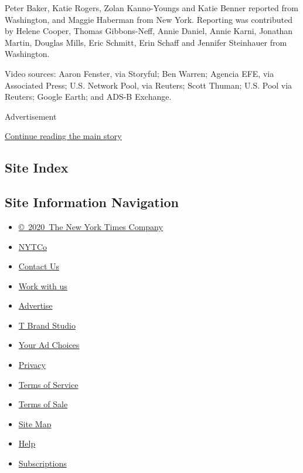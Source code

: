 Peter Baker, Katie Rogers, Zolan Kanno-Youngs and Katie Benner reported
from Washington, and Maggie Haberman from New York. Reporting was
contributed by Helene Cooper, Thomas Gibbons-Neff, Annie Daniel, Annie
Karni, Jonathan Martin, Douglas Mills, Eric Schmitt, Erin Schaff and
Jennifer Steinhauer from Washington.

Video sources: Aaron Fenster, via Storyful; Ben Warren; Agencia EFE, via
Associated Press; U.S. Network Pool, via Reuters; Scott Thuman; U.S.
Pool via Reuters; Google Earth; and ADS-B Exchange.

Advertisement

\protect\hyperlink{after-bottom}{Continue reading the main story}

\hypertarget{site-index}{%
\subsection{Site Index}\label{site-index}}

\hypertarget{site-information-navigation}{%
\subsection{Site Information
Navigation}\label{site-information-navigation}}

\begin{itemize}
\tightlist
\item
  \href{https://help.nytimes3xbfgragh.onion/hc/en-us/articles/115014792127-Copyright-notice}{©~2020~The
  New York Times Company}
\end{itemize}

\begin{itemize}
\tightlist
\item
  \href{https://www.nytco.com/}{NYTCo}
\item
  \href{https://help.nytimes3xbfgragh.onion/hc/en-us/articles/115015385887-Contact-Us}{Contact
  Us}
\item
  \href{https://www.nytco.com/careers/}{Work with us}
\item
  \href{https://nytmediakit.com/}{Advertise}
\item
  \href{http://www.tbrandstudio.com/}{T Brand Studio}
\item
  \href{https://www.nytimes3xbfgragh.onion/privacy/cookie-policy\#how-do-i-manage-trackers}{Your
  Ad Choices}
\item
  \href{https://www.nytimes3xbfgragh.onion/privacy}{Privacy}
\item
  \href{https://help.nytimes3xbfgragh.onion/hc/en-us/articles/115014893428-Terms-of-service}{Terms
  of Service}
\item
  \href{https://help.nytimes3xbfgragh.onion/hc/en-us/articles/115014893968-Terms-of-sale}{Terms
  of Sale}
\item
  \href{https://spiderbites.nytimes3xbfgragh.onion}{Site Map}
\item
  \href{https://help.nytimes3xbfgragh.onion/hc/en-us}{Help}
\item
  \href{https://www.nytimes3xbfgragh.onion/subscription?campaignId=37WXW}{Subscriptions}
\end{itemize}
